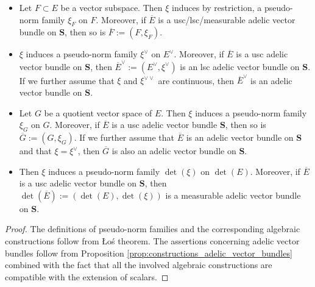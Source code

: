 \documentclass [11pt,reqno]{amsart}
\newcommand{\1}{\mathmybb{1}}
\begin{document}
\begin{proposition-definition}
\begin{itemize}
\begin{itemize}
	\item[(i)] Let $F\subset E$ be a vector subspace. Then $\xi$ induces by restriction, a pseudo-norm family $\xi_{F}$ on $F$. Moreover, if $\overline{E}$ is a usc/lsc/measurable adelic vector bundle on $\mathbf{S}$, then so is $\overline{F}:=(F,\xi_{F})$.
		\item[(ii)] $\xi$ induces a pseudo-norm family $\xi^{\vee}$ on $E^{\vee}$. Moreover, if $\overline{E}$ is a usc adelic vector bundle on $\mathbf{S}$, then $\overline{E}^{\vee}:=(E^{\vee},\xi^{\vee})$ is an lsc adelic vector bundle on $\mathbf{S}$. If we further assume that $\xi$ and $\xi^{\vee\vee}$ are continuous, then $\overline{E}^{\vee}$ is an adelic vector bundle on $\mathbf{S}$.
		\item[(iii)] Let $G$ be a quotient vector space of $E$. Then $\xi$ induces a pseudo-norm family $\xi_{G}$ on $G$. Moreover, if $\overline{E}$ is a usc adelic vector bundle $\mathbf{S}$, then so is $\overline{G}:=(G,\xi_{G})$. If we further assume that $\overline{E}$ is an adelic vector bundle on $\mathbf{S}$ and that $\xi=\xi^{\vee}$, then $\overline{G}$ is also an adelic vector bundle on $\mathbf{S}$. 
		\item[(iv)] Then $\xi$ induces a pseudo-norm family $\det(\xi)$ on $\det(E)$. Moreover, if $\overline{E}$ is a usc adelic vector bundle on $\mathbf{S}$, then $\det(\overline{E}):=(\det(E),\det(\xi))$ is a measurable adelic vector bundle on $\mathbf{S}$.
	\end{itemize}
\end{itemize}
\end{proposition-definition}

\begin{proof}
The definitions of pseudo-norm families and the corresponding algebraic constructions follow from \L{}o\'s theorem. The assertions concerning adelic vector bundles follow from Proposition \ref{prop:constructions_adelic_vector_bundles} combined with the fact that all the involved algebraic constructions are compatible with the extension of scalars.
\end{proof}
\end{document}
